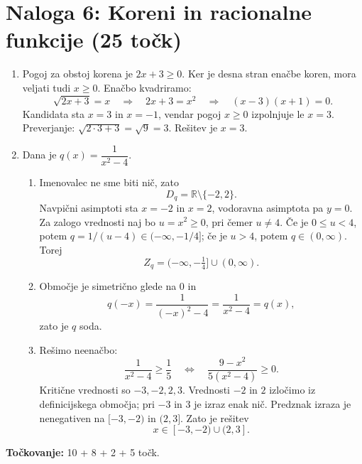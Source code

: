 \documentclass[a4paper,12pt]{article}
\begin{document}
\section*{Naloga 6: Koreni in racionalne funkcije \hfill\normalfont\normalsize(25 točk)}
\begin{enumerate}[label=\arabic*)]
	\item Pogoj za obstoj korena je $2x+3\geq0$. Ker je desna stran enačbe koren, mora veljati tudi $x\geq0$. Enačbo kvadriramo:
	\[
		\sqrt{2x+3}=x\quad\Longrightarrow\quad 2x+3=x^2
		\quad\Longrightarrow\quad (x-3)(x+1)=0.
	\]
	Kandidata sta $x=3$ in $x=-1$, vendar pogoj $x\geq0$ izpolnjuje le $x=3$. Preverjanje: $\sqrt{2\cdot3+3}=\sqrt9=3$. Rešitev je $\boxed{x=3}$.
	\item Dana je $q(x)=\dfrac{1}{x^2-4}$.
	\begin{enumerate}[label=\alph*)]
		\item Imenovalec ne sme biti nič, zato
		\[
			D_q=\mathbb{R}\setminus\{-2,2\}.
		\]
		Navpični asimptoti sta $x=-2$ in $x=2$, vodoravna asimptota pa $y=0$.
		Za zalogo vrednosti naj bo $u=x^2\geq0$, pri čemer $u\ne4$. Če je $0\leq u<4$, potem $q=1/(u-4)\in(-\infty,-1/4]$; če je $u>4$, potem $q\in(0,\infty)$. Torej
		\[
			Z_q=(-\infty,-\tfrac14]\cup(0,\infty).
		\]
		\item Območje je simetrično glede na $0$ in
		\[
			q(-x)=\frac{1}{(-x)^2-4}=\frac{1}{x^2-4}=q(x),
		\]
		zato je $q$ soda.
		\item Rešimo neenačbo:
		\[
			\frac{1}{x^2-4}\geq\frac15
			\quad\Longleftrightarrow\quad
			\frac{9-x^2}{5(x^2-4)}\geq0.
		\]
		Kritične vrednosti so $-3,-2,2,3$. Vrednosti $-2$ in $2$ izločimo iz definicijskega območja; pri $-3$ in $3$ je izraz enak nič. Predznak izraza je nenegativen na $[-3,-2)$ in $(2,3]$. Zato je rešitev
		\[
			\boxed{x\in[-3,-2)\cup(2,3]}.
		\]
	\end{enumerate}
\end{enumerate}
\textbf{Točkovanje:} 10 + 8 + 2 + 5 točk.
\end{document}
